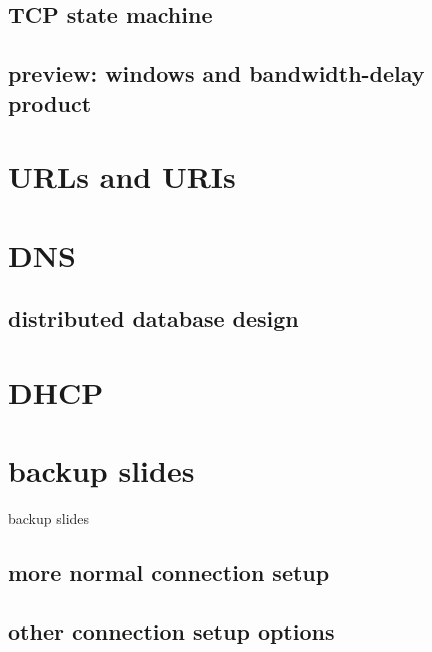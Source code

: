 \subsection{TCP state machine}

\subsection{preview: windows and bandwidth-delay product}

\section{URLs and URIs}

\section{DNS}

\subsection{distributed database design}

\section{DHCP}



\section{backup slides}
\begin{frame}{backup slides}
\end{frame}

\subsection{more normal connection setup}



\subsection{other connection setup options}





